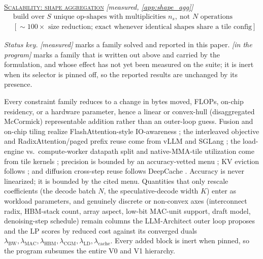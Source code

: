 \begin{landscape}
\begin{center}
{\begin{minipage}{0.965\linewidth}
\begin{minipage}[t]{0.485\linewidth}
\underline{\textsc{Scalability: shape aggregation}} \hfill\emph{[measured, \cref{app:shape_agg}]}
\vspace{-4pt}
\begin{align*}
&\text{build over }S\text{ unique op-shapes with multiplicities }n_s,\ \text{not }N\text{ operations}\\[-2pt]
&[{\sim}100\times\text{ size reduction; exact whenever identical shapes share a tile config}]
\end{align*}
\end{minipage}

\vspace{3pt}
\noindent\scriptsize\emph{Status key.} \emph{[measured]} marks a family solved and
reported in this paper. \emph{[in the program]} marks a family that is written
out above and carried by the formulation, and whose effect has not yet been
measured on the suite; it is inert when its selector is pinned off, so the
reported results are unchanged by its presence.
\footnotesize
\vspace{2pt}
\end{minipage}}
\end{center}

\vspace{4pt}
\noindent\small
Every constraint family reduces to a change in bytes moved, FLOPs, on-chip
residency, or a hardware parameter, hence a linear or convex-hull (disaggregated
McCormick) representable addition rather than an outer-loop guess. Fusion and on-chip tiling
realize FlashAttention-style IO-awareness \citep{dao2022flashattention}; the
interleaved objective and RadixAttention/paged prefix reuse come from vLLM and
SGLang \citep{kwon2023vllm,zheng2024sglang}; the load-engine vs.\ compute-worker
datapath split and native-MMA-tile utilization come from tile kernels
\citep{spector2024thunderkittens}; precision is bounded by an accuracy-vetted menu
\citep{lin2024awq,frantar2023gptq,hooper2024kvquant}; KV eviction follows
\citep{xiao2024streamingllm,zhang2023h2o}; and diffusion cross-step reuse follows
DeepCache \citep{ma2024deepcache}. Accuracy is never linearized; it is bounded by
the cited menu. Quantities that only rescale coefficients (the decode batch $N$,
the speculative-decode width $K$) enter as workload parameters, and genuinely
discrete or non-convex axes (interconnect radix, HBM-stack count, array aspect,
low-bit MAC-unit support, draft model, denoising-step schedule) remain columns the
LLM-Architect outer loop proposes and the LP scores by reduced cost against its
converged duals $\lambda_{\mathrm{BW}},\lambda_{\mathrm{MAC}},\lambda_{\mathrm{HBM}},
\lambda_{\mathrm{CGM}},\lambda_{\mathrm{LD}},\lambda_{\mathrm{cache}}$. Every added
block is inert when pinned, so the program subsumes the entire V0 and V1 hierarchy.

\end{landscape}
